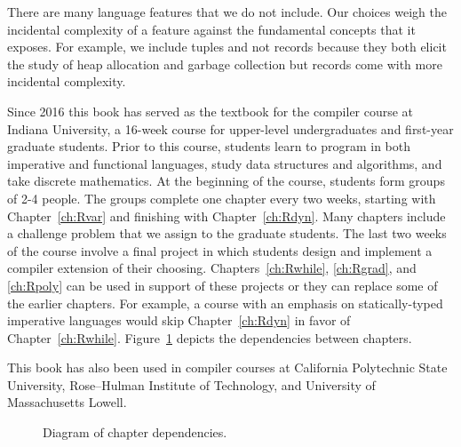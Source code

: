 \documentclass[11pt]{book}
\begin{document}
There are many language features that we do not include. Our choices
weigh the incidental complexity of a feature against the fundamental
concepts that it exposes. For example, we include tuples and not
records because they both elicit the study of heap allocation and
garbage collection but records come with more incidental complexity.

Since 2016 this book has served as the textbook for the compiler
course at Indiana University, a 16-week course for upper-level
undergraduates and first-year graduate students.
%
Prior to this course, students learn to program in both imperative and
functional languages, study data structures and algorithms, and take
discrete mathematics.
%
At the beginning of the course, students form groups of 2-4 people.
The groups complete one chapter every two weeks, starting with
Chapter~\ref{ch:Rvar} and finishing with Chapter~\ref{ch:Rdyn}. Many
chapters include a challenge problem that we assign to the graduate
students. The last two weeks of the course involve a final project in
which students design and implement a compiler extension of their
choosing.  Chapters~\ref{ch:Rwhile}, \ref{ch:Rgrad}, and
\ref{ch:Rpoly} can be used in support of these projects or they can
replace some of the earlier chapters. For example, a course with an
emphasis on statically-typed imperative languages would skip
Chapter~\ref{ch:Rdyn} in favor of
Chapter~\ref{ch:Rwhile}. Figure~\ref{fig:chapter-dependences} depicts
the dependencies between chapters.

This book has also been used in compiler courses at California
Polytechnic State University, Rose–Hulman Institute of Technology, and
University of Massachusetts Lowell.


\begin{figure}[tp]
  \caption{Diagram of chapter dependencies.}
  \label{fig:chapter-dependences}
\end{figure}
\end{document}
